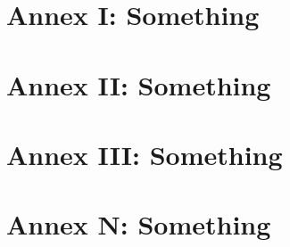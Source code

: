
\appendix
\chapter{Annex I: Something}


\chapter{Annex II: Something}


\chapter{Annex III: Something}


\chapter{Annex N: Something}

